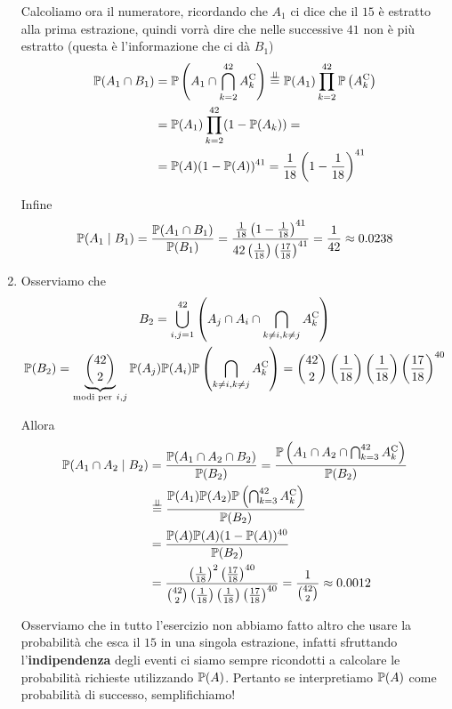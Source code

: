 \begin{enumerate}
Calcoliamo ora il numeratore, ricordando che $A_{1}$ ci dice che il $15$ è estratto alla prima estrazione, quindi vorrà dire che nelle successive $41$ non è più estratto (questa è l'informazione che ci dà $B_{1}$)\begin{align*}
\mathbb{P}(A_{1} \cap B_{1}) & =\mathbb{P}\left(A_{1} \cap \bigcap _{k=2}^{42} A_{k}^{\mathrm{C}}\right)\overset{\perp \!\!\! \perp }{=}\mathbb{P}(A_{1})\prod _{k=2}^{42}\mathbb{P}\left(A_{k}^{\mathrm{C}}\right)\\
 & =\mathbb{P}(A_{1})\prod _{k=2}^{42}(1-\mathbb{P}(A_{k})) =\\
 & =\mathbb{P}(A)(1-\mathbb{P}(A))^{41} =\frac{1}{18}\left(1-\frac{1}{18}\right)^{41}
\end{align*}

Infine
\begin{equation*}
\mathbb{P}(A_{1} \mid B_{1}) =\frac{\mathbb{P}(A_{1} \cap B_{1})}{\mathbb{P}(B_{1})} =\frac{\frac{1}{18}\left(1-\frac{1}{18}\right)^{41}}{42\left(\frac{1}{18}\right)\left(\frac{17}{18}\right)^{41}} =\frac{1}{42} \approx 0.0238
\end{equation*}
\item Osserviamo che
\begin{gather*}
B_{2} =\bigcup _{i,j=1}^{42}\left(A_{j} \cap A_{i} \cap \bigcap _{k\neq i,k\neq j} A_{k}\complementary\right)\\
\PP(B_{2}) =\underbrace{\binom{42}{2}}_{\text{modi per} \ i,j}\PP(A_{j})\PP(A_{i})\PP\left(\bigcap _{k\neq i,k\neq j} A_{k}\complementary\right) =\binom{42}{2}\left(\frac{1}{18}\right)\left(\frac{1}{18}\right)\left(\frac{17}{18}\right)^{40}
\end{gather*}

Allora
\begin{align*}
\mathbb{P}(A_{1} \cap A_{2} \mid B_{2}) & =\frac{\mathbb{P}(A_{1} \cap A_{2} \cap B_{2})}{\mathbb{P}(B_{2})} =\frac{\mathbb{P}\left(A_{1} \cap A_{2} \cap \bigcap _{k=3}^{42} A_{k}^{\mathrm{C}}\right)}{\mathbb{P}(B_{2})}\\
 & \overset{\perp \!\!\! \perp }{=}\frac{\mathbb{P}(A_{1})\mathbb{P}(A_{2})\mathbb{P}\left(\bigcap _{k=3}^{42} A_{k}^{\mathrm{C}}\right)}{\mathbb{P}(B_{2})}\\
 & =\frac{\mathbb{P}(A)\mathbb{P}(A)(1-\mathbb{P}(A))^{40}}{\mathbb{P}(B_{2})}\\
 & =\frac{\left(\frac{1}{18}\right)^{2}\left(\frac{17}{18}\right)^{40}}{\binom{42}{2}\left(\frac{1}{18}\right)\left(\frac{1}{18}\right)\left(\frac{17}{18}\right)^{40}} =\frac{1}{\binom{42}{2}} \approx 0.0012
\end{align*}

\begin{oss}
Osserviamo che in tutto l'esercizio non abbiamo fatto altro che usare la probabilità che esca il $15$ in una singola estrazione, infatti sfruttando l'\textbf{indipendenza} degli eventi ci siamo sempre ricondotti a calcolare le probabilità richieste utilizzando $\mathbb{P}(A)$. Pertanto se interpretiamo $\mathbb{P}(A)$ come probabilità di successo, semplifichiamo!
\end{oss}

\end{enumerate}

